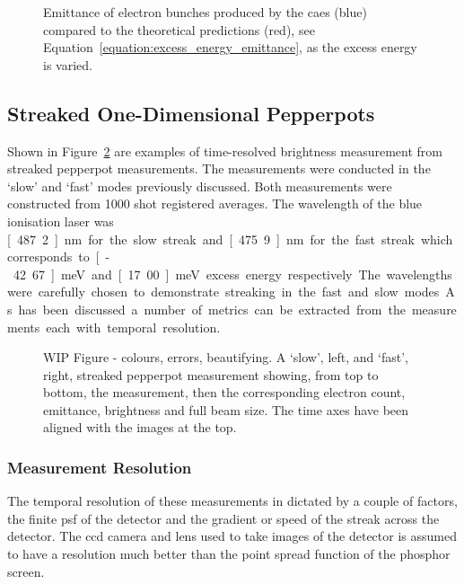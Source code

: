 \begin{figure}
    \center
    
    \caption{Emittance of electron bunches produced by the \gls{caes} (blue) compared to the theoretical predictions (red), see Equation~\ref{equation:excess_energy_emittance}, as the excess energy is varied.}
    \label{figure:emittance_vs_theory}
\end{figure}


\subsection{Streaked One-Dimensional Pepperpots}\label{section:streaked_pepperpot_results}
Shown in Figure~\ref{figure:streaks} are examples of time-resolved brightness measurement from streaked pepperpot measurements.
The measurements were conducted in the `slow' and `fast' modes previously discussed.
Both measurements were constructed from 1000 shot registered averages.
The wavelength of the blue ionisation laser was \unit[487.2]{nm} for the slow streak and \unit[475.9]{nm} for the fast streak which corresponds to \unit[-42.67]{meV} and \unit[17.00]{meV} excess energy respectively.
The wavelengths were carefully chosen to demonstrate streaking in the fast and slow modes.
As has been discussed a number of metrics can be extracted from the measurements each with temporal resolution.

\begin{figure}
    \center
    
    \caption{{\color{red}WIP Figure - colours, errors, beautifying.} A `slow', left, and `fast', right, streaked pepperpot measurement showing, from top to bottom, the measurement, then the corresponding electron count, emittance, brightness and full beam size. The time axes have been aligned with the images at the top.}
    \label{figure:streaks}
\end{figure}

\subsubsection{Measurement Resolution}
The temporal resolution of these measurements in dictated by a couple of factors, the finite \gls{psf} of the detector and the gradient or speed of the streak across the detector.
The \gls{ccd} camera and lens used to take images of the detector is assumed to have a resolution much better than the point spread function of the phosphor screen.

